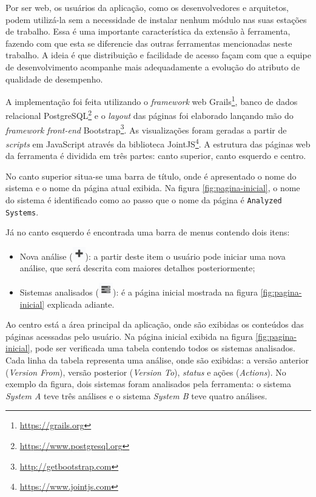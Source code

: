 Por ser web, os usuários da aplicação, como os desenvolvedores e arquitetos, podem utilizá-la sem a necessidade de instalar nenhum módulo nas suas estações de trabalho. Essa é uma importante característica da extensão à ferramenta, fazendo com que esta se diferencie das outras ferramentas mencionadas neste trabalho. A ideia é que distribuição e facilidade de acesso façam com que a equipe de desenvolvimento acompanhe mais adequadamente a evolução do atributo de qualidade de desempenho.

A implementação foi feita utilizando o \textit{framework} web Grails\footnote{\href{https://grails.org}{https://grails.org}}, banco de dados relacional PostgreSQL\footnote{\href{https://www.postgresql.org}{https://www.postgresql.org}} e o \textit{layout} das páginas foi elaborado lançando mão do \textit{framework front-end} Bootstrap\footnote{\href{http://getbootstrap.com}{http://getbootstrap.com}}. As visualizações foram geradas a partir de \textit{scripts} em JavaScript através da biblioteca JointJS\footnote{\href{https://www.jointjs.com}{https://www.jointjs.com}}. A estrutura das páginas web da ferramenta é dividida em três partes: canto superior, canto esquerdo e centro.

No canto superior situa-se uma barra de título, onde é apresentado o nome do sistema e o nome da página atual exibida. Na figura \ref{fig:pagina-inicial}, o nome do sistema é identificado como \texttt{\toolName} ao passo que o nome da página é \texttt{Analyzed Systems}.

Já no canto esquerdo é encontrada uma barra de menus contendo dois itens:
\begin{itemize}
   \item Nova análise (\includegraphics[height=1.5em,valign=b]{Imagens/icon_new_analysis.png}): a partir deste item o usuário pode iniciar uma nova análise, que será descrita com maiores detalhes posteriormente;
   \item Sistemas analisados (\includegraphics[height=1.5em,valign=b]{Imagens/icon_analyzed_systems.png}): é a página inicial mostrada na figura \ref{fig:pagina-inicial} explicada adiante.
\end{itemize}

Ao centro está a área principal da aplicação, onde são exibidas os conteúdos das páginas acessadas pelo usuário. Na página inicial exibida na figura \ref{fig:pagina-inicial}, pode ser verificada uma tabela contendo todos os sistemas analisados. Cada linha da tabela representa uma análise, onde são exibidas: a versão anterior (\textit{Version From}), versão posterior (\textit{Version To}), \textit{status} e ações (\textit{Actions}). No exemplo da figura, dois sistemas foram analisados pela ferramenta: o sistema \textit{System A} teve três análises e o sistema \textit{System B} teve quatro análises.

